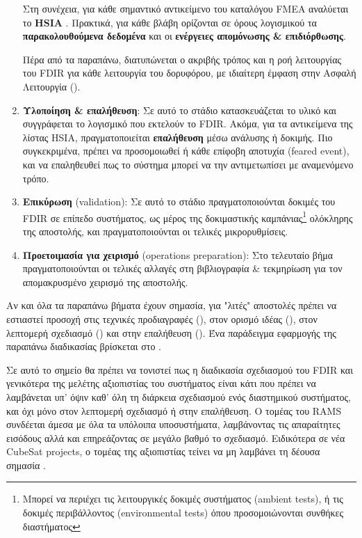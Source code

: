 \documentclass[a4paper,nobib]{tufte-book}
\begin{document}
\begin{enumerate}
	Στη συνέχεια, για κάθε σημαντικό αντικείμενο του καταλόγου \acs{FMEA} αναλύεται το \textbf{\acf{HSIA}} \autocite{ECSS-Q-ST-30-02C}. Πρακτικά, για κάθε βλάβη ορίζονται σε όρους λογισμικού τα \textbf{παρακολουθούμενα δεδομένα} και οι \textbf{ενέργειες απομόνωσης \& επιδιόρθωσης}.
	
	Πέρα από τα παραπάνω, διατυπώνεται ο ακριβής τρόπος και η ροή λειτουργίας του \acs{FDIR} για κάθε λειτουργία του δορυφόρου, με ιδιαίτερη έμφαση στην Ασφαλή Λειτουργία ().
	\label{itm:fdir_cdr}
	\item \textbf{Υλοποίηση \& επαλήθευση}: Σε αυτό το στάδιο κατασκευάζεται το υλικό και συγγράφεται το λογισμικό που εκτελούν το \acs{FDIR}. Ακόμα, για τα αντικείμενα της λίστας \acs{HSIA}, πραγματοποιείται \textbf{επαλήθευση} μέσω ανάλυσης ή δοκιμής. Πιο συγκεκριμένα, πρέπει να προσομοιωθεί ή κάθε επίφοβη αποτυχία (feared event), και να επαληθευθεί πως το σύστημα μπορεί να την αντιμετωπίσει με αναμενόμενο τρόπο.
	\label{itm:fdir_valid}
	\item \textbf{Επικύρωση} (validation): Σε αυτό το στάδιο πραγματοποιούνται δοκιμές του \acs{FDIR} σε επίπεδο συστήματος, ως μέρος της δοκιμαστικής καμπάνιας\footnote{Μπορεί να περιέχει τις λειτουργικές δοκιμές συστήματος (ambient tests), ή τις δοκιμές περιβάλλοντος (environmental tests) όπου προσομοιώνονται συνθήκες διαστήματος} ολόκληρης της αποστολής, και πραγματοποιούνται οι τελικές μικρορυθμίσεις.
	\item \textbf{Προετοιμασία για χειρισμό} (operations preparation): Στο τελευταίο βήμα πραγματοποιούνται οι τελικές αλλαγές στη βιβλιογραφία \& τεκμηρίωση για τον απομακρυσμένο χειρισμό της αποστολής.
\end{enumerate}

Αν και όλα τα παραπάνω βήματα έχουν σημασία, για "λιτές" αποστολές πρέπει να εστιαστεί προσοχή στις τεχνικές προδιαγραφές (), στον ορισμό ιδέας (), στον λεπτομερή σχεδιασμό () και στην επαλήθευση (). Ένα παράδειγμα εφαρμογής της παραπάνω διαδικασίας βρίσκεται στο .

Σε αυτό το σημείο θα πρέπει να τονιστεί πως η διαδικασία σχεδιασμού του \acs{FDIR} και γενικότερα της μελέτης αξιοπιστίας του συστήματος είναι κάτι που πρέπει να λαμβάνεται υπ' όψιν καθ' όλη τη διάρκεια σχεδιασμού ενός διαστημικού συστήματος, και όχι μόνο στον λεπτομερή σχεδιασμό ή στην επαλήθευση. Ο τομέας του \acf{RAMS} συνδέεται άμεσα με όλα τα υπόλοιπα υποσυστήματα, λαμβάνοντας τις απαραίτητες εισόδους αλλά και επηρεάζοντας σε μεγάλο βαθμό το σχεδιασμό. Ειδικότερα σε νέα CubeSat projects, ο τομέας της αξιοπιστίας τείνει να μη λαμβάνει τη δέουσα σημασία \autocite{langer_reliability_estimation_2017}.
\end{document}
